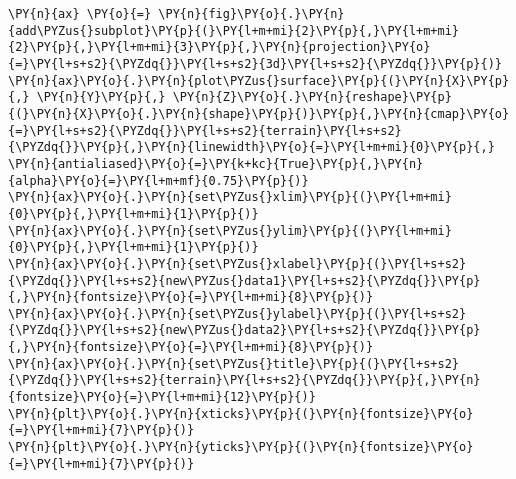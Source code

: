 \begin{tcolorbox}[breakable, size=fbox, boxrule=1pt, pad at break*=1mm,colback=cellbackground, colframe=cellborder]
\begin{Verbatim}[commandchars=\\\{\}]
\PY{n}{ax} \PY{o}{=} \PY{n}{fig}\PY{o}{.}\PY{n}{add\PYZus{}subplot}\PY{p}{(}\PY{l+m+mi}{2}\PY{p}{,}\PY{l+m+mi}{2}\PY{p}{,}\PY{l+m+mi}{3}\PY{p}{,}\PY{n}{projection}\PY{o}{=}\PY{l+s+s2}{\PYZdq{}}\PY{l+s+s2}{3d}\PY{l+s+s2}{\PYZdq{}}\PY{p}{)}
\PY{n}{ax}\PY{o}{.}\PY{n}{plot\PYZus{}surface}\PY{p}{(}\PY{n}{X}\PY{p}{,} \PY{n}{Y}\PY{p}{,} \PY{n}{Z}\PY{o}{.}\PY{n}{reshape}\PY{p}{(}\PY{n}{X}\PY{o}{.}\PY{n}{shape}\PY{p}{)}\PY{p}{,}\PY{n}{cmap}\PY{o}{=}\PY{l+s+s2}{\PYZdq{}}\PY{l+s+s2}{terrain}\PY{l+s+s2}{\PYZdq{}}\PY{p}{,}\PY{n}{linewidth}\PY{o}{=}\PY{l+m+mi}{0}\PY{p}{,} \PY{n}{antialiased}\PY{o}{=}\PY{k+kc}{True}\PY{p}{,}\PY{n}{alpha}\PY{o}{=}\PY{l+m+mf}{0.75}\PY{p}{)}
\PY{n}{ax}\PY{o}{.}\PY{n}{set\PYZus{}xlim}\PY{p}{(}\PY{l+m+mi}{0}\PY{p}{,}\PY{l+m+mi}{1}\PY{p}{)}
\PY{n}{ax}\PY{o}{.}\PY{n}{set\PYZus{}ylim}\PY{p}{(}\PY{l+m+mi}{0}\PY{p}{,}\PY{l+m+mi}{1}\PY{p}{)}
\PY{n}{ax}\PY{o}{.}\PY{n}{set\PYZus{}xlabel}\PY{p}{(}\PY{l+s+s2}{\PYZdq{}}\PY{l+s+s2}{new\PYZus{}data1}\PY{l+s+s2}{\PYZdq{}}\PY{p}{,}\PY{n}{fontsize}\PY{o}{=}\PY{l+m+mi}{8}\PY{p}{)}
\PY{n}{ax}\PY{o}{.}\PY{n}{set\PYZus{}ylabel}\PY{p}{(}\PY{l+s+s2}{\PYZdq{}}\PY{l+s+s2}{new\PYZus{}data2}\PY{l+s+s2}{\PYZdq{}}\PY{p}{,}\PY{n}{fontsize}\PY{o}{=}\PY{l+m+mi}{8}\PY{p}{)}
\PY{n}{ax}\PY{o}{.}\PY{n}{set\PYZus{}title}\PY{p}{(}\PY{l+s+s2}{\PYZdq{}}\PY{l+s+s2}{terrain}\PY{l+s+s2}{\PYZdq{}}\PY{p}{,}\PY{n}{fontsize}\PY{o}{=}\PY{l+m+mi}{12}\PY{p}{)}
\PY{n}{plt}\PY{o}{.}\PY{n}{xticks}\PY{p}{(}\PY{n}{fontsize}\PY{o}{=}\PY{l+m+mi}{7}\PY{p}{)}
\PY{n}{plt}\PY{o}{.}\PY{n}{yticks}\PY{p}{(}\PY{n}{fontsize}\PY{o}{=}\PY{l+m+mi}{7}\PY{p}{)}


\end{Verbatim}
\end{tcolorbox}
